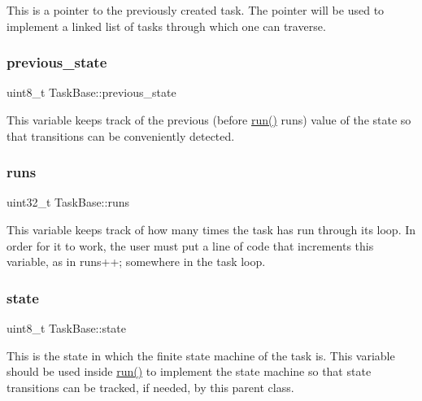 This is a pointer to the previously created task. The pointer will be used to implement a linked list of tasks through which one can traverse. \mbox{\label{class_task_base_a9736ccdb46487c91c49bdbf2c24b52d3}} 
\subsubsection{\texorpdfstring{previous\+\_\+state}{previous\_state}}
{\footnotesize\ttfamily uint8\+\_\+t Task\+Base\+::previous\+\_\+state\hspace{0.3cm}{\ttfamily [protected]}}

This variable keeps track of the previous (before \mbox{\hyperlink{class_task_base_adcf6036ad9c860051ccf392ba5e7dbbc}{run()}} runs) value of the state so that transitions can be conveniently detected. \mbox{\label{class_task_base_ab5503939e17359f0f3f9249f622df389}} 
\subsubsection{\texorpdfstring{runs}{runs}}
{\footnotesize\ttfamily uint32\+\_\+t Task\+Base\+::runs\hspace{0.3cm}{\ttfamily [protected]}}

This variable keeps track of how many times the task has run through its loop. In order for it to work, the user must put a line of code that increments this variable, as in {\ttfamily runs++}; somewhere in the task loop. \mbox{\label{class_task_base_aab6866bbd5d036810829ccc7cd3ab0e8}} 
\subsubsection{\texorpdfstring{state}{state}}
{\footnotesize\ttfamily uint8\+\_\+t Task\+Base\+::state\hspace{0.3cm}{\ttfamily [protected]}}

This is the state in which the finite state machine of the task is. This variable should be used inside \mbox{\hyperlink{class_task_base_adcf6036ad9c860051ccf392ba5e7dbbc}{run()}} to implement the state machine so that state transitions can be tracked, if needed, by this parent class. 

